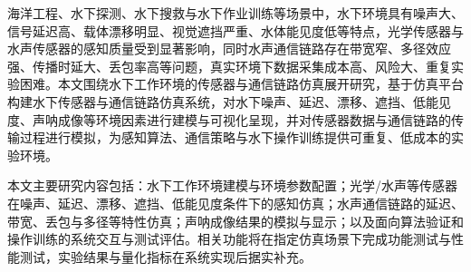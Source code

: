 \begin{abstractzh}

海洋工程、水下探测、水下搜救与水下作业训练等场景中，水下环境具有噪声大、信号延迟高、载体漂移明显、视觉遮挡严重、水体能见度低等特点，光学传感器与水声传感器的感知质量受到显著影响，同时水声通信链路存在带宽窄、多径效应强、传播时延大、丢包率高等问题，真实环境下数据采集成本高、风险大、重复实验困难。本文围绕水下工作环境的传感器与通信链路仿真展开研究，基于仿真平台构建水下传感器与通信链路仿真系统，对水下噪声、延迟、漂移、遮挡、低能见度、声呐成像等环境因素进行建模与可视化呈现，并对传感器数据与通信链路的传输过程进行模拟，为感知算法、通信策略与水下操作训练提供可重复、低成本的实验环境。

本文主要研究内容包括：水下工作环境建模与环境参数配置；光学/水声等传感器在噪声、延迟、漂移、遮挡、低能见度条件下的感知仿真；水声通信链路的延迟、带宽、丢包与多径等特性仿真；声呐成像结果的模拟与显示；以及面向算法验证和操作训练的系统交互与测试评估。相关功能将在指定仿真场景下完成功能测试与性能测试，实验结果与量化指标在系统实现后据实补充。

\end{abstractzh}
